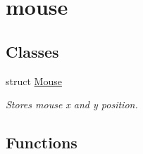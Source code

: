 \hypertarget{group__mouse}{}\section{mouse}
\label{group__mouse}
\subsection*{Classes}
\begin{DoxyCompactItemize}
\item 
struct \hyperlink{structMouse}{Mouse}
\begin{DoxyCompactList}\small\item\em Stores mouse x and y position. \end{DoxyCompactList}\end{DoxyCompactItemize}
\subsection*{Functions}
